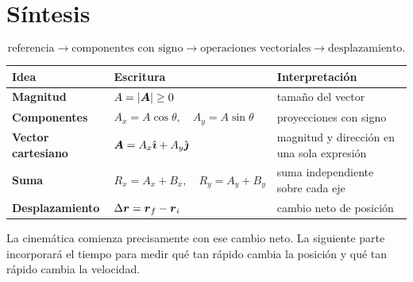 \documentclass[11pt]{article}
\begin{document}
\section{Síntesis}

\[
  \text{referencia}
  \longrightarrow
  \text{componentes con signo}
  \longrightarrow
  \text{operaciones vectoriales}
  \longrightarrow
  \text{desplazamiento}.
\]

\begin{center}
\begin{tabularx}{\textwidth}{>{\bfseries}l X X}
\toprule
Idea & Escritura & Interpretación \\
\midrule
Magnitud
& \(A=|\boldsymbol{A}|\geq0\)
& tamaño del vector \\
Componentes
& \(A_x=A\cos\theta,\quad A_y=A\sin\theta\)
& proyecciones con signo \\
Vector cartesiano
& \(\boldsymbol{A}=A_x\hat{\boldsymbol{\imath}}+A_y\hat{\boldsymbol{\jmath}}\)
& magnitud y dirección en una sola expresión \\
Suma
& \(R_x=A_x+B_x,\quad R_y=A_y+B_y\)
& suma independiente sobre cada eje \\
Desplazamiento
& \(\Delta\boldsymbol{r}=\boldsymbol{r}_f-\boldsymbol{r}_i\)
& cambio neto de posición \\
\bottomrule
\end{tabularx}
\end{center}

La cinemática comienza precisamente con ese cambio neto. La siguiente parte
incorporará el tiempo para medir qué tan rápido cambia la posición y qué tan
rápido cambia la velocidad.
\end{document}
